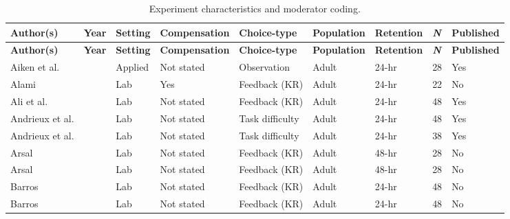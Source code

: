 \documentclass[man,floatsintext,hidelinks]{apa7}
\begin{document}
\footnotesize
\begin{landscape}
\begin{longtable}[l]{lllllllll}
	\caption{Experiment characteristics and moderator coding.}
	\label{tab:Table1}\\
\hline
\textbf{Author(s)}            & \textbf{Year}           & \textbf{Setting}     & \textbf{Compensation} & \textbf{Choice-type}           & \textbf{Population} & \textbf{Retention}          & \textbf{\emph{N}}   & \textbf{Published} \\
\hline
\endfirsthead
%
\hline
\textbf{Author(s)}            & \textbf{Year}           & \textbf{Setting}     & \textbf{Compensation} & \textbf{Choice-type}           & \textbf{Population} & \textbf{Retention}          & \textbf{\emph{N}}   & \textbf{Published} \\
\hline
\endhead
%
Aiken et al.          & \citeyear{Aiken2012-po}           & Applied     & Not stated   & Observation           & Adult        & 24-hr              & 28  & Yes       \\
Alami                 & \citeyear{Alami2013-gy}           & Lab         & Yes          & Feedback (KR)         & Adult        & 24-hr              & 22  & No        \\
Ali et al.            & \citeyear{Ali2012-rq}           & Lab         & Not stated   & Feedback (KR)         & Adult        & 24-hr              & 48  & Yes       \\
Andrieux et al.       & \citeyear{Andrieux2016-lf}           & Lab         & Not stated   & Task difficulty       & Adult        & 24-hr              & 48  & Yes       \\
Andrieux et al.       & \citeyear{Andrieux2012-dj}           & Lab         & Not stated   & Task difficulty       & Adult        & 24-hr              & 38  & Yes       \\
Arsal                 & \citeyear[Exp 1]{Arsal2004-kf}   & Lab         & Not stated   & Feedback (KR)         & Adult        & 48-hr              & 28  & No        \\
Arsal                 & \citeyear[Exp 2]{Arsal2004-kf}   & Lab         & Not stated   & Feedback (KR)         & Adult        & 48-hr              & 28  & No        \\
Barros                & \citeyear[Blocked]{Barros2010-pc}  & Lab         & Not stated   & Feedback (KR)         & Adult        & 24-hr              & 48  & No        \\
Barros                & \citeyear[Random]{Barros2010-pc}   & Lab         & Not stated   & Feedback (KR)         & Adult        & 24-hr              & 48  & No        \\

\end{longtable}
\end{landscape}
\end{document}
